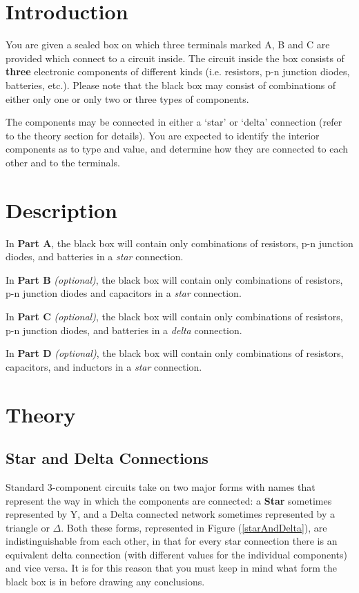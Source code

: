 \section*{Introduction}

You are given a sealed box on which three terminals marked A, B and C are provided which connect to a circuit inside. The circuit inside the box consists of \textbf{three} electronic components of different kinds (i.e. resistors, p-n junction diodes, batteries, etc.). Please note that the black box may consist of combinations of either only one or only two or three types of components. 

The components may be connected in either a `star' or `delta' connection (refer to the theory section for details). You are expected to identify the interior components as to type and value, and determine how they are connected to each other and to the terminals. 


\section*{Description}

In \textbf{Part A}, the black box will contain only combinations of resistors, p-n junction diodes, and batteries in a \textit{star} connection.

In \textbf{Part B} \textit{(optional)}, the black box will contain only combinations of resistors, p-n junction diodes and capacitors in a \textit{star} connection. 

In \textbf{Part C} \textit{(optional)}, the black box will contain only combinations of resistors, p-n junction diodes, and batteries in a \textit{delta} connection. 

In \textbf{Part D} \textit{(optional)}, the black box will contain only combinations of  resistors, capacitors, and inductors in a \textit{star} connection.


\section*{Theory}

\subsection*{Star and Delta Connections}

Standard 3-component circuits take on two major forms with names that represent the way in which the components are connected: a \textbf{Star} sometimes represented by Y, and a Delta connected network sometimes represented by a triangle or $\Delta$. Both these forms, represented in Figure (\ref{starAndDelta}), are indistinguishable from each other, in that for every star connection there is an equivalent delta connection (with different values for the individual components) and vice versa. It is for this reason that you must keep in mind what form the black box is in before drawing any conclusions.

